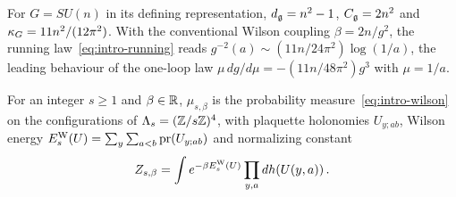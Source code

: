 \begin{remark}\label{rem:SUn}
For $G=SU(n)$ in its defining representation, $d_{\mathfrak{g}}=n^2-1$, $C_{\mathfrak{g}}=2n^2$ and $\kappa_G=11n^2/(12\pi^2)$. With the conventional Wilson coupling $\beta=2n/g^2$, the running law~\eqref{eq:intro-running} reads $g^{-2}(a)\sim(11n/24\pi^2)\log(1/a)$, the leading behaviour of the one-loop law $\mu\,dg/d\mu=-(11n/48\pi^2)g^3$ with $\mu=1/a$.
\end{remark}

\begin{definition}\label{def:D02}
For an integer $s\ge1$ and $\beta\in\mathbb{R}$, $\mu_{s,\beta}$ is the probability measure~\eqref{eq:intro-wilson} on the configurations of $\Lambda_s=(\mathbb{Z}/s\mathbb{Z})^4$, with plaquette holonomies $U_{y;ab}$, Wilson energy $E_s^{\rm W}(U)=\sum_{y}\sum_{a<b}\operatorname{pr}(U_{y;ab})$ and normalizing constant
\begin{equation*}
Z_{s,\beta}=\int e^{-\beta E_s^{\rm W}(U)}\prod_{y,a}dh(U(y,a))\,.
\end{equation*}
\end{definition}

